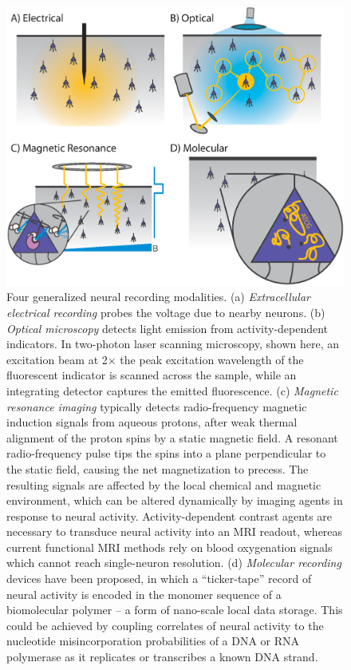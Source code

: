 \begin{figure}[htbp]
\centering
\includegraphics[width=0.8\linewidth]{figs/Fig1.eps}
\caption{Four generalized neural recording modalities. (a) \emph{Extracellular electrical recording} probes the voltage due to nearby neurons. (b) \emph{Optical microscopy} detects light emission from activity-dependent indicators. In two-photon laser scanning microscopy, shown here, an excitation beam at 2$\times$ the peak excitation wavelength of the fluorescent indicator is scanned across the sample, while an integrating detector captures the emitted fluorescence. (c) \emph{Magnetic resonance imaging} typically detects radio-frequency magnetic induction signals from aqueous protons, after weak thermal alignment of the proton spins by a static magnetic field. A resonant radio-frequency pulse tips the spins into a plane perpendicular to the static field, causing the net magnetization to precess. The resulting signals are affected by the local chemical and magnetic environment, which can be altered dynamically by imaging agents in response to neural activity. Activity-dependent contrast agents are necessary to transduce neural activity into an MRI readout, whereas current functional MRI methods rely on blood oxygenation signals which cannot reach single-neuron resolution. (d) \emph{Molecular recording} devices have been proposed, in which a “ticker-tape” record of neural activity is encoded in the monomer sequence of a biomolecular polymer – a form of nano-scale local data storage. This could be achieved by coupling correlates of neural activity to the nucleotide misincorporation probabilities of a DNA or RNA polymerase as it replicates or transcribes a known DNA strand.}  \label{fig:modalities}

\end{figure}


